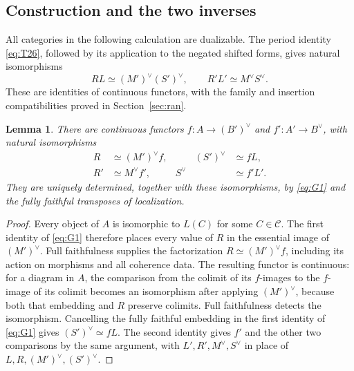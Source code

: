 \documentclass[11pt]{article}
\numberwithin{equation}{section}
\newtheorem{lemma}[theorem]{Lemma}
\theoremstyle{definition}
\theoremstyle{remark}
\begin{document}
\subsection{Construction and the two inverses}

All categories in the following calculation are dualizable.  The period
identity \eqref{eq:T26}, followed by its application to the negated
shifted forms, gives natural isomorphisms
\begin{equation}\label{eq:G1}
 RL\simeq(M')^\vee(S')^\vee,
 \qquad
 R'L'\simeq M^\vee S^\vee.
\end{equation}
These are identities of continuous functors, with the family and
insertion compatibilities proved in Section~\ref{sec:ran}.

\begin{lemma}\label{equivalence:factorization}
There are continuous functors
\(f:A\to(B')^\vee\) and \(f':A'\to B^\vee\), with natural
isomorphisms
\begin{equation}\label{eq:G2}
 \begin{aligned}
 R&\simeq(M')^\vee f,&\qquad (S')^\vee&\simeq fL,\\
 R'&\simeq M^\vee f',& S^\vee&\simeq f'L'.
 \end{aligned}
\end{equation}
They are uniquely determined, together with these isomorphisms, by
\eqref{eq:G1} and the fully faithful transposes of localization.
\end{lemma}

\begin{proof}
Every object of \(A\) is isomorphic to \(L(C)\) for some
\(C\in\mathcal C\).  The first identity of \eqref{eq:G1} therefore
places every value of \(R\) in the essential image of \((M')^\vee\).
Full faithfulness supplies the factorization \(R\simeq(M')^\vee f\),
including its action on morphisms and all coherence data.  The resulting
functor is continuous: for a diagram in \(A\), the comparison from the
colimit of its \(f\)-images to the \(f\)-image of its colimit becomes an
isomorphism after applying \((M')^\vee\), because both that embedding
and \(R\) preserve colimits.  Full faithfulness detects the
isomorphism.  Cancelling the fully faithful embedding in the first
identity of \eqref{eq:G1} gives \((S')^\vee\simeq fL\).
The second identity gives \(f'\) and the other two comparisons by the
same argument, with \(L',R',M^\vee,S^\vee\) in place of
\(L,R,(M')^\vee,(S')^\vee\).
\end{proof}
\end{document}
